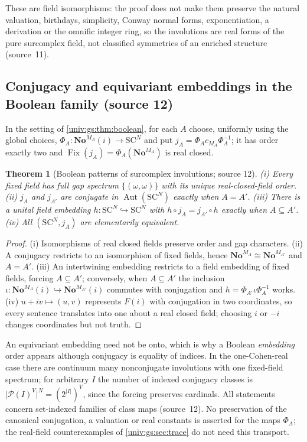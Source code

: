 \documentclass[11pt,letterpaper]{article}
\numberwithin{equation}{section}
\newtheorem{theorem}{Theorem}[section]
\theoremstyle{definition}
\theoremstyle{remark}
\newcommand{\No}{\mathbf{No}}
\newcommand{\SC}{\mathrm{SC}}
\newcommand{\SCN}{\SC^{N}}
\newcommand{\Pow}{\mathcal P}
\newcommand{\Fix}{\operatorname{Fix}}
\newcommand{\Aut}{\operatorname{Aut}}
\newcommand{\abs}[1]{\lvert#1\rvert}
\begin{document}
These are field isomorphisms: the proof does not make them preserve the natural valuation,
birthdays, simplicity, Conway normal forms, exponentiation, a derivation or the omnific integer
ring, so the involutions are real forms of the pure surcomplex field, not classified symmetries of
an enriched structure (source~11).

\subsection{Conjugacy and equivariant embeddings in the Boolean family (source 12)}

In the setting of \cref{univ:gs:thm:boolean}, for each $A$ choose, uniformly using the global
choices, $\Phi_A:\No^{M_A}(i)\to\SCN$ and put $j_A=\Phi_Ac_{M_A}\Phi_A^{-1}$; it has order exactly two
and $\Fix(j_A)=\Phi_A(\No^{M_A})$ is real closed.

\begin{theorem}[Boolean patterns of surcomplex involutions; source 12]\label{univ:gs:thm:boolinvolutions}
(i) Every fixed field has full gap spectrum $\{(\omega,\omega)\}$ with its unique real-closed-field
order. (ii) $j_A$ and $j_{A'}$ are conjugate in $\Aut(\SCN)$ exactly when $A=A'$. (iii) There is a
unital field embedding $h:\SCN\hookrightarrow\SCN$ with $h\circ j_A=j_{A'}\circ h$ exactly when
$A\subseteq A'$. (iv) All $(\SCN,j_A)$ are elementarily equivalent.
\end{theorem}
\begin{proof}
(i) Isomorphisms of real closed fields preserve order and gap characters. (ii) A conjugacy
restricts to an isomorphism of fixed fields, hence $\No^{M_A}\cong\No^{M_{A'}}$ and $A=A'$. (iii) An
intertwining embedding restricts to a field embedding of fixed fields, forcing $A\subseteq A'$;
conversely, when $A\subseteq A'$ the inclusion $\iota:\No^{M_A}(i)\hookrightarrow\No^{M_{A'}}(i)$
commutes with conjugation and $h=\Phi_{A'}\iota\Phi_A^{-1}$ works. (iv) $u+iv\mapsto(u,v)$ represents
$F(i)$ with conjugation in two coordinates, so every sentence translates into one about a real
closed field; choosing $i$ or $-i$ changes coordinates but not truth.
\end{proof}

An equivariant embedding need not be onto, which is why a Boolean \emph{embedding} order appears
although conjugacy is equality of indices. In the one-Cohen-real case there are continuum many
nonconjugate involutions with one fixed-field spectrum; for arbitrary $I$ the number of indexed
conjugacy classes is $\abs{\Pow(I)^V}^N=(2^{\abs I})^V$, since the forcing preserves cardinals. All
statements concern set-indexed families of class maps (source~12). No preservation of the canonical
conjugation, a valuation or real constants is asserted for the maps $\Phi_A$; the real-field
counterexamples of \cref{univ:gs:sec:trace} do not need this transport.
\end{document}
